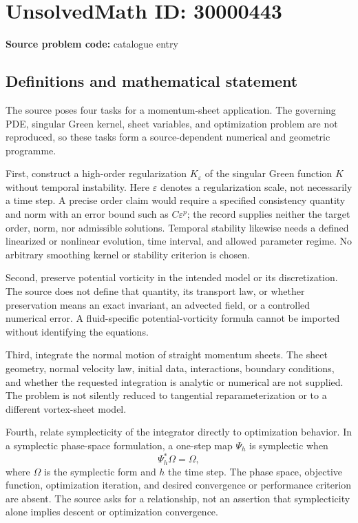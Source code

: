 \documentclass[11pt]{article}
\begin{document}
\section*{UnsolvedMath ID: 30000443}
\textbf{Source problem code:} catalogue entry
\subsection{Definitions and mathematical statement}
The source poses four tasks for a momentum-sheet application. The governing PDE, singular Green kernel, sheet variables, and optimization problem are not reproduced, so these tasks form a source-dependent numerical and geometric programme.

First, construct a high-order regularization \(K_\varepsilon\) of the singular Green function \(K\) without temporal instability. Here \(\varepsilon\) denotes a regularization scale, not necessarily a time step. A precise order claim would require a specified consistency quantity and norm with an error bound such as \(C\varepsilon^p\); the record supplies neither the target order, norm, nor admissible solutions. Temporal stability likewise needs a defined linearized or nonlinear evolution, time interval, and allowed parameter regime. No arbitrary smoothing kernel or stability criterion is chosen.

Second, preserve potential vorticity in the intended model or its discretization. The source does not define that quantity, its transport law, or whether preservation means an exact invariant, an advected field, or a controlled numerical error. A fluid-specific potential-vorticity formula cannot be imported without identifying the equations.

Third, integrate the normal motion of straight momentum sheets. The sheet geometry, normal velocity law, initial data, interactions, boundary conditions, and whether the requested integration is analytic or numerical are not supplied. The problem is not silently reduced to tangential reparameterization or to a different vortex-sheet model.

Fourth, relate symplecticity of the integrator directly to optimization behavior. In a symplectic phase-space formulation, a one-step map \(\Psi_h\) is symplectic when
\[
\Psi_h^*\Omega=\Omega,
\]
where \(\Omega\) is the symplectic form and \(h\) the time step. The phase space, objective function, optimization iteration, and desired convergence or performance criterion are absent. The source asks for a relationship, not an assertion that symplecticity alone implies descent or optimization convergence.
\end{document}
